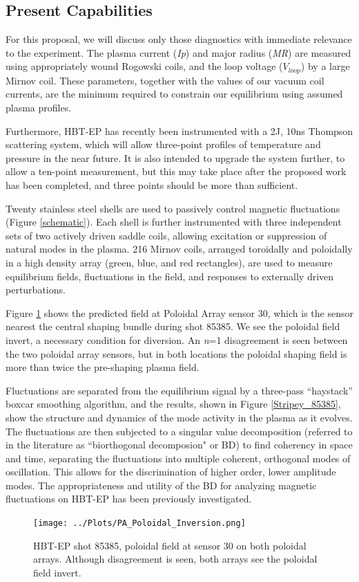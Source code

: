 \documentclass[aps,preprint,showpacs,superscriptaddress,groupedaddress]{revtex4}  %
\begin{document}
\subsection{Present Capabilities}
	For this proposal, we will discuss only those diagnostics with immediate relevance to the experiment.  The plasma current (\textit{Ip}) and major radius (\textit{MR}) are measured using appropriately wound Rogowski coils, and the loop voltage (\textit{$V_{loop}$}) by a large Mirnov coil.  These parameters, together with the values of our vacuum coil currents, are the minimum required to constrain our equilibrium using assumed plasma profiles.\par
	Furthermore, HBT-EP has recently been instrumented with a 2J, 10ns Thompson scattering system, which will allow three-point profiles of temperature and pressure in the near future.  It is also intended to upgrade the system further, to allow a ten-point measurement, but this may take place after the proposed work has been completed, and three points should be more than sufficient.\par
	Twenty stainless steel shells are used to passively control magnetic fluctuations (Figure \ref{schematic}).  Each shell is further instrumented with three independent sets of two actively driven saddle coils, allowing excitation or suppression of natural modes in the plasma.  216 Mirnov coils, arranged toroidally and poloidally in a high density array (green, blue, and red rectangles), are used to measure equilibrium fields, fluctuations in the field, and responses to externally driven perturbations.\par
	Figure \ref{PA_Poloidal_Inversion} shows the predicted field at Poloidal Array sensor 30, which is the sensor nearest the central shaping bundle during shot 85385.  We see the poloidal field invert, a necessary condition for diversion.  An \textit{n}=1 disagreement is seen between the two poloidal array sensors, but in both locations the poloidal shaping field is more than twice the pre-shaping plasma field.\par
	Fluctuations are separated from the equilibrium signal by a three-pass ``haystack'' boxcar smoothing algorithm, and the results, shown in Figure \ref{Stripey_85385}, show the structure and dynamics of the mode activity in the plasma as it evolves.  The fluctuations are then subjected to a singular value decomposition (referred to in the literature as ``biorthogonal decomposion" or BD\cite{de Wit}) to find coherency in space and time, separating the fluctuations into multiple coherent, orthogonal modes of oscillation.  This allows for the discrimination of higher order, lower amplitude modes.  The appropriateness and utility of the BD for analyzing magnetic fluctuations on HBT-EP has been previously investigated\cite{Levesque}.\par
\begin{figure}[t]
\centering
\texttt{[image: ../Plots/PA\_Poloidal\_Inversion.png]}\caption{HBT-EP shot 85385, poloidal field at sensor 30 on both poloidal arrays.  Although disagreement is seen, both arrays see the poloidal field invert.}
\label{PA_Poloidal_Inversion}
\end{figure}
\end{document}
